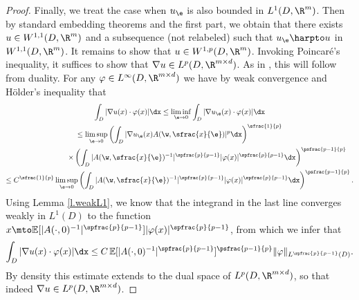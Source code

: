 \begin{proof}
Finally, we treat the case when $u_{\e}$ is also bounded in $L^1(D,\R^m)$. Then by standard embedding theorems and the first part, we obtain that there exists $u\in W^{1,1}(D,\R^m)$ and a subsequence (not relabeled) such that $u_{\e}\harpto u$ in $W^{1,1}(D,\R^m)$. It remains to show that $u\in W^{1,p}(D,\R^m)$. Invoking Poincaré's inequality, it suffices to show that $\nabla u\in L^p(D,\R^{m\times d})$. As in \cite{NSS}, this will follow from duality. For any $\varphi\in L^{\infty}(D,\R^{m\times d})$ we have by weak convergence and Hölder's inequality that
\begin{multline*}
\int_D|\nabla u(x)\cdot\varphi(x)|\dx\leq\liminf_{\e\to 0}\int_D|\nabla u_{\e}(x)\cdot\varphi(x)|\dx
\\
\leq \limsup_{\e\to 0}\left(\int_D|\nabla u_{\e}(x)A(\w,\sfrac{x}{\e})|^p\dx\right)^{\sfrac{1}{p}}\\
\shoveright{\times\left(\int_D|A(\w,\sfrac{x}{\e})^{-1}|^{\spfrac{p}{p-1}}|\varphi(x)|^{\spfrac{p}{p-1}}\dx\right)^{\psfrac{p-1}{p}}}
\\
\leq C^{\sfrac{1}{p}}\limsup_{\e\to 0}\left(\int_D|A(\w,\sfrac{x}{\e})^{-1}|^{\spfrac{p}{p-1}}|\varphi(x)|^{\spfrac{p}{p-1}}\dx\right)^{\psfrac{p-1}{p}}.
\end{multline*}
Using Lemma \ref{l.weakL1}, we know that the integrand in the last line converges weakly in $L^1(D)$ to the function $x\mto \mathbb{E}[|A(\cdot,0)^{-1}|^{\spfrac{p}{p-1}}]|\varphi(x)|^{\spfrac{p}{p-1}}$, from which we infer that
\begin{equation*}
\int_D|\nabla u(x)\cdot\varphi(x)|\dx\leq C\, \mathbb{E}[|A(\cdot,0)^{-1}|^{\spfrac{p}{p-1}}]^{\psfrac{p-1}{p}}\|\varphi\|_{L^{\spfrac{p}{p-1}}(D)}.
\end{equation*}
By density this estimate extends to the dual space of $L^p(D,\R^{m\times d})$, so that indeed $\nabla u\in L^p(D,\R^{m\times d})$.
\end{proof}

